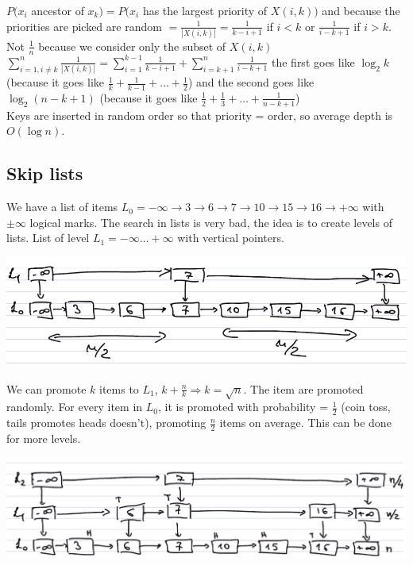 \documentclass[10pt]{report}
\begin{document}
$P(x_i$ ancestor of $x_k) = P(x_i$ has the largest priority of $X(i,k))$ and because the priorities are picked are random $= \frac{1}{|X(i,k)|} = \frac{1}{k - i + 1}$ if $i < k$ or $\frac{1}{i - k + 1}$ if $i > k$. Not $\frac{1}{n}$ because we consider only the subset of $X(i,k)$\\
$\sum_{i=1, i\neq k}^n \frac{1}{|X(i,k)|} = \sum_{i = 1}^{k-1} \frac{1}{k-i + 1} + \sum_{i = k+1}^n \frac{1}{i - k + 1}$ the first goes like $\log_2 k$ (because it goes like $\frac{1}{k} + \frac{1}{k-1} + \ldots + \frac{1}{2}$) and the second goes like $\log_2 (n - k + 1)$ (because it goes like $\frac{1}{2} + \frac{1}{3} + \ldots + \frac{1}{n-k+1}$)\\
Keys are inserted in random order so that priority = order, so average depth is $O(\log n)$.
\subsection{Skip lists} We have a list of items $L_0 = -\infty \rightarrow 3 \rightarrow 6 \rightarrow 7 \rightarrow 10 \rightarrow 15 \rightarrow 16 \rightarrow +\infty$ with $\pm\infty$ logical marks. The search in lists is very bad, the idea is to create levels of lists. List of level $L_1 = -\infty \ldots +\infty$ with vertical pointers.
\begin{center}
	\includegraphics[scale=0.5]{5.png}
\end{center}
We can promote $k$ items to $L_1$, $k + \frac{n}{k} \Rightarrow k = \sqrt{n}$. The item are promoted randomly. For every item in $L_0$, it is promoted with probability = $\frac{1}{2}$ (coin toss, tails promotes heads doesn't), promoting $\frac{n}{2}$ items on average. This can be done for more levels.
\begin{center}
	\includegraphics[scale=0.5]{6.png}
\end{center}
\end{document}

